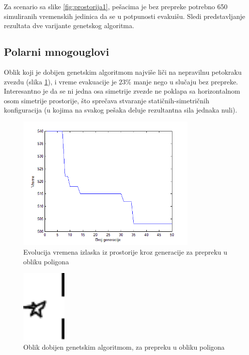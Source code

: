 \documentclass[12pt]{article}
\begin{document}
Za scenario sa slike \ref{fig:prostorija1}, pešacima je bez prepreke potrebno 650 simuliranih vremenskih jedinica da se u potpunosti evakuišu. Sledi predstavljanje rezultata dve varijante genetskog algoritma.

\subsection*{Polarni mnogouglovi}
Oblik koji je dobijen genetskim algoritmom najviše liči na nepravilnu petokraku zvezdu (slika \ref{fig:polygon2}), i vreme evakuacije je $23\%$ manje nego u slučaju bez prepreke. Interesantno je da se ni jedna osa simetrije zvezde ne poklapa sa horizontalnom osom simetrije prostorije, što sprečava stvaranje statičnih-simetričnih konfiguracija (u kojima na svakog pešaka deluje rezultantna sila jednaka nuli).
\begin{figure}[H]
\centering
\includegraphics[width=0.8\textwidth]{06_Grafik_evakuacija_poligon}
\caption{Evolucija vremena izlaska iz prostorije kroz generacije za prepreku u obliku poligona}
\end{figure}

\begin{figure}[H]
\centering
\includegraphics[width=0.2\textwidth]{07_Prepreka_poligon}
\caption{Oblik dobijen genetskim algoritmom, za prepreku u obliku poligona}
\label{fig:polygon2}
\end{figure}
\end{document}

